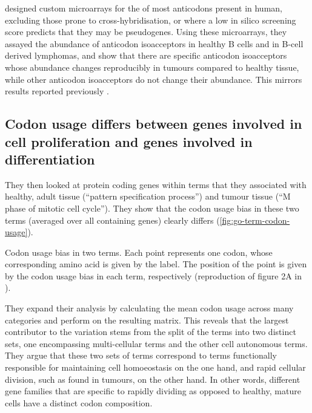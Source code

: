 \citet{Gingold:2014} designed custom microarrays for the \trna[s] of most
anticodons present in human, excluding those prone to cross-hybridi\-sation, or
where a low in silico screening score predicts that they may be pseudogenes.
Using these microarrays, they assayed the abundance of anticodon isoacceptors in
healthy B cells and in B-cell derived lymphomas, and show that there are
specific anticodon isoacceptors whose abundance changes reproducibly in tumours
compared to healthy tissue, while other anticodon isoacceptors do not change
their abundance. This mirrors results reported previously
\citep{Pavon-Eternod:2009}.

\subsection{Codon usage differs between genes involved in cell proliferation and
genes involved in differentiation}

They then looked at protein coding genes within \go terms that they associated
with healthy, adult tissue (“pattern specification process”) and tumour tissue
(“M phase of mitotic cell cycle”). They show that the codon usage bias in these
two \go terms (averaged over all containing genes) clearly differs
(\cref{fig:go-term-codon-usage}).

    {Codon usage bias in two  terms.}
    {Each point represents one codon, whose corresponding amino acid is given by
    the label. The position of the point is given by the codon usage bias in
    each \go term, respectively (reproduction of figure 2A in
    \citet{Gingold:2014}).}

They expand their analysis by calculating the mean codon usage across many \go
categories and perform \pca on the resulting matrix. This reveals that the
largest contributor to the variation stems from the split of the \go terms into
two distinct sets, one encompassing multi-cellular \go terms and the other cell
autonomous \go terms. They argue that these two sets of \go terms correspond to
\go terms functionally responsible for maintaining cell homoeostasis on the one
hand, and rapid cellular division, such as found in tumours, on the other hand.
In other words, different gene families that are specific to rapidly dividing as
opposed to healthy, mature cells have a distinct codon composition.

